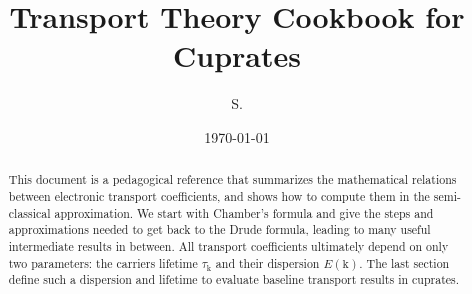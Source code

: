 \documentclass[notitlepage,11pt,nofootinbib]{revtex4-1}
\renewcommand{\vec}[1]{\bm{\mathrm{#1}}}
\begin{document}
\title{Transport Theory Cookbook for Cuprates}
\author{S. }
\date{\today}

\begin{abstract}
This document is a pedagogical reference that summarizes the mathematical relations between electronic transport coefficients, and shows how to compute them in the semi-classical approximation. We start with Chamber's formula and give the steps and approximations needed to get back to the Drude formula, leading to many useful intermediate results in between. All transport coefficients ultimately depend on only two parameters: the carriers lifetime $\tau_{\vec k}$ and their dispersion $E(\vec k)$. The last section define such a dispersion and lifetime to evaluate baseline transport results in cuprates.
\end{abstract}

\maketitle
\vspace{-0.5cm}
\tableofcontents
\end{document}
